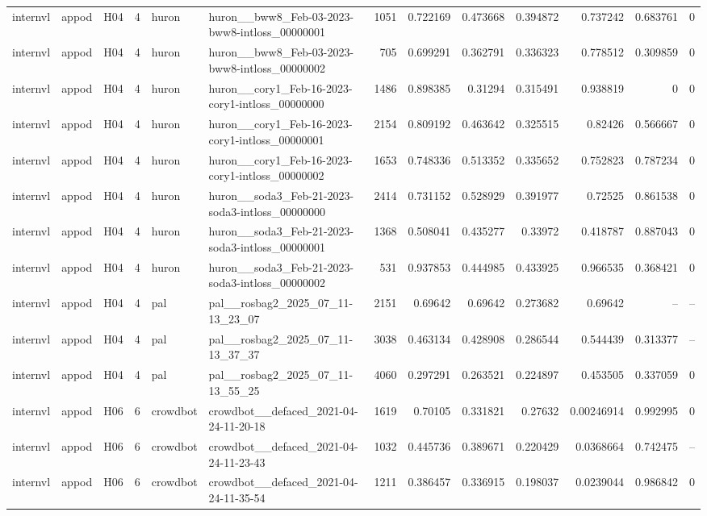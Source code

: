 \begin{longtable}{lllrllrrrrrrr}
internvl & appod & H04 & 4 & huron & huron\_\_bww8\_Feb-03-2023-bww8-intloss\_00000001 & 1051 & 0.722169 & 0.473668 & 0.394872 & 0.737242 & 0.683761 & 0 \\
internvl & appod & H04 & 4 & huron & huron\_\_bww8\_Feb-03-2023-bww8-intloss\_00000002 & 705 & 0.699291 & 0.362791 & 0.336323 & 0.778512 & 0.309859 & 0 \\
internvl & appod & H04 & 4 & huron & huron\_\_cory1\_Feb-16-2023-cory1-intloss\_00000000 & 1486 & 0.898385 & 0.31294 & 0.315491 & 0.938819 & 0 & 0 \\
internvl & appod & H04 & 4 & huron & huron\_\_cory1\_Feb-16-2023-cory1-intloss\_00000001 & 2154 & 0.809192 & 0.463642 & 0.325515 & 0.82426 & 0.566667 & 0 \\
internvl & appod & H04 & 4 & huron & huron\_\_cory1\_Feb-16-2023-cory1-intloss\_00000002 & 1653 & 0.748336 & 0.513352 & 0.335652 & 0.752823 & 0.787234 & 0 \\
internvl & appod & H04 & 4 & huron & huron\_\_soda3\_Feb-21-2023-soda3-intloss\_00000000 & 2414 & 0.731152 & 0.528929 & 0.391977 & 0.72525 & 0.861538 & 0 \\
internvl & appod & H04 & 4 & huron & huron\_\_soda3\_Feb-21-2023-soda3-intloss\_00000001 & 1368 & 0.508041 & 0.435277 & 0.33972 & 0.418787 & 0.887043 & 0 \\
internvl & appod & H04 & 4 & huron & huron\_\_soda3\_Feb-21-2023-soda3-intloss\_00000002 & 531 & 0.937853 & 0.444985 & 0.433925 & 0.966535 & 0.368421 & 0 \\
internvl & appod & H04 & 4 & pal & pal\_\_rosbag2\_2025\_07\_11-13\_23\_07 & 2151 & 0.69642 & 0.69642 & 0.273682 & 0.69642 & -- & -- \\
internvl & appod & H04 & 4 & pal & pal\_\_rosbag2\_2025\_07\_11-13\_37\_37 & 3038 & 0.463134 & 0.428908 & 0.286544 & 0.544439 & 0.313377 & -- \\
internvl & appod & H04 & 4 & pal & pal\_\_rosbag2\_2025\_07\_11-13\_55\_25 & 4060 & 0.297291 & 0.263521 & 0.224897 & 0.453505 & 0.337059 & 0 \\
internvl & appod & H06 & 6 & crowdbot & crowdbot\_\_defaced\_2021-04-24-11-20-18 & 1619 & 0.70105 & 0.331821 & 0.27632 & 0.00246914 & 0.992995 & 0 \\
internvl & appod & H06 & 6 & crowdbot & crowdbot\_\_defaced\_2021-04-24-11-23-43 & 1032 & 0.445736 & 0.389671 & 0.220429 & 0.0368664 & 0.742475 & -- \\
internvl & appod & H06 & 6 & crowdbot & crowdbot\_\_defaced\_2021-04-24-11-35-54 & 1211 & 0.386457 & 0.336915 & 0.198037 & 0.0239044 & 0.986842 & 0 \\

\end{longtable}
